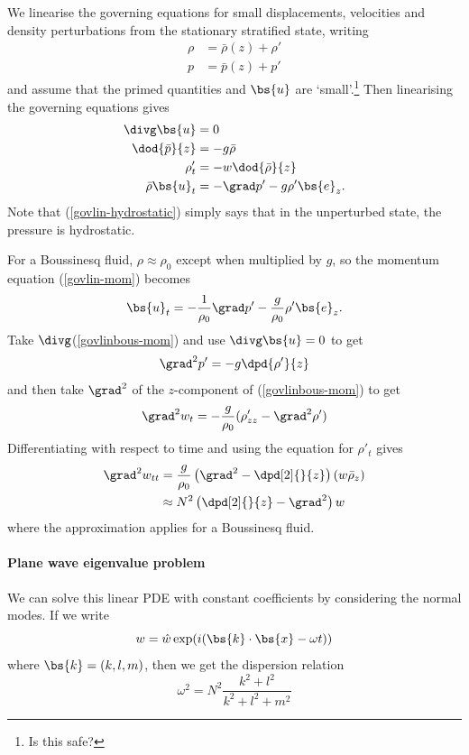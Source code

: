 We linearise the governing equations for small displacements, velocities and
density perturbations from the stationary stratified state, writing
\begin{align}
	\rho &= \bar{\rho}(z) + \rho' \\
	p &= \bar{p}(z) + p' 
\end{align}
and assume that the primed quantities and $\bs{u}$ are `small'.\footnote{Is this
safe?} Then linearising the governing equations gives
\begin{align}
	\divg\bs{u} &= 0\\
    \dod{\bar{p}}{z} &= -g\bar{\rho} \label{govlin-hydrostatic} \\
	\rho'_t &= -w\dod{\bar{\rho}}{z} \\
	\bar{\rho} \bs{u}_t &= -\grad p' - g\rho'\bs{e}_z. \label{govlin-mom}
\end{align}
Note that (\ref{govlin-hydrostatic}) simply says that in the unperturbed state,
the pressure is hydrostatic.

For a Boussinesq fluid, $\rho\approx\rho_0$ except when multiplied by $g$, so
the momentum equation (\ref{govlin-mom}) becomes
\begin{align}
	\bs{u}_t = -\frac{1}{\rho_0}\grad p' - \frac{g}{\rho_0} \rho' \bs{e}_z. \label{govlinbous-mom}
\end{align}
Take $\divg$(\ref{govlinbous-mom}) and use $\divg\bs{u} = 0$ to get
\begin{equation}
	\grad^2p' = -g\dpd{\rho'}{z}
\end{equation}
and then take $\grad^2$ of the $z$-component of (\ref{govlinbous-mom}) to get 
\begin{equation}
	\grad^2 w_t = -\frac{g}{\rho_0} (\rho'_{zz} - \grad^2 \rho')
\end{equation}
Differentiating with respect to time and using the equation for $\rho'_t$ gives
\begin{align}
	\grad^2w_{tt} &= \frac{g}{\rho_0} \left(\grad^2 - \dpd[2]{}{z}\right) (w\bar{\rho}_z) \\
			&\approx N^2 \left(\dpd[2]{}{z} - \grad^2\right) w
			\label{igw-govlin-w}
\end{align}
where the approximation applies for a Boussinesq fluid.

\paragraph{Plane wave eigenvalue problem}
We can solve this linear PDE with constant coefficients by considering the normal
modes. If we write
\begin{equation}
	w = \hat{w}\exp(i(\bs{k}\cdot\bs{x}-\omega t))
\end{equation}
where $\bs{k} = (k,l,m)$, then we get the dispersion relation
\begin{equation}
	\omega^2 = N^2 \frac{k^2+l^2}{k^2+l^2+m^2}
	\label{igwdisprel-klm}
\end{equation}

